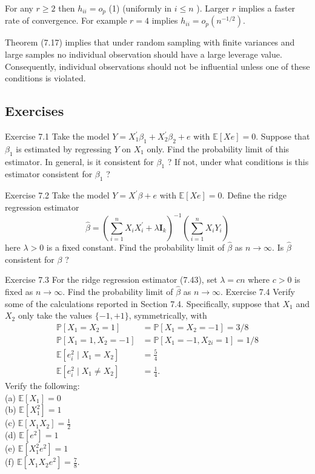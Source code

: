 \documentclass[10pt]{article}
\begin{document}
For any $r \geq 2$ then $h_{i i}=o_{p}$ (1) (uniformly in $i \leq n$ ). Larger $r$ implies a faster rate of convergence. For example $r=4$ implies $h_{i i}=o_{p}\left(n^{-1 / 2}\right)$.

Theorem (7.17) implies that under random sampling with finite variances and large samples no individual observation should have a large leverage value. Consequently, individual observations should not be influential unless one of these conditions is violated.

\subsection{Exercises}
Exercise 7.1 Take the model $Y=X_{1}^{\prime} \beta_{1}+X_{2}^{\prime} \beta_{2}+e$ with $\mathbb{E}[X e]=0$. Suppose that $\beta_{1}$ is estimated by regressing $Y$ on $X_{1}$ only. Find the probability limit of this estimator. In general, is it consistent for $\beta_{1}$ ? If not, under what conditions is this estimator consistent for $\beta_{1}$ ?

Exercise 7.2 Take the model $Y=X^{\prime} \beta+e$ with $\mathbb{E}[X e]=0$. Define the ridge regression estimator
$$
\widehat{\beta}=\left(\sum_{i=1}^{n} X_{i} X_{i}^{\prime}+\lambda \boldsymbol{I}_{k}\right)^{-1}\left(\sum_{i=1}^{n} X_{i} Y_{i}\right)
$$
here $\lambda>0$ is a fixed constant. Find the probability limit of $\widehat{\beta}$ as $n \rightarrow \infty$. Is $\widehat{\beta}$ consistent for $\beta$ ?

Exercise 7.3 For the ridge regression estimator (7.43), set $\lambda=c n$ where $c>0$ is fixed as $n \rightarrow \infty$. Find the probability limit of $\widehat{\beta}$ as $n \rightarrow \infty$. Exercise 7.4 Verify some of the calculations reported in Section 7.4. Specifically, suppose that $X_{1}$ and $X_{2}$ only take the values $\{-1,+1\}$, symmetrically, with
$$
\begin{aligned}
\mathbb{P}\left[X_{1}=X_{2}=1\right] &=\mathbb{P}\left[X_{1}=X_{2}=-1\right]=3 / 8 \\
\mathbb{P}\left[X_{1}=1, X_{2}=-1\right] &=\mathbb{P}\left[X_{1}=-1, X_{2 i}=1\right]=1 / 8 \\
\mathbb{E}\left[e_{i}^{2} \mid X_{1}=X_{2}\right] &=\frac{5}{4} \\
\mathbb{E}\left[e_{i}^{2} \mid X_{1} \neq X_{2}\right] &=\frac{1}{4} .
\end{aligned}
$$
Verify the following:\\
(a) $\mathbb{E}\left[X_{1}\right]=0$\\
(b) $\mathbb{E}\left[X_{1}^{2}\right]=1$\\
(c) $\mathbb{E}\left[X_{1} X_{2}\right]=\frac{1}{2}$\\
(d) $\mathbb{E}\left[e^{2}\right]=1$\\
(e) $\mathbb{E}\left[X_{1}^{2} e^{2}\right]=1$\\
(f) $\mathbb{E}\left[X_{1} X_{2} e^{2}\right]=\frac{7}{8}$.
\end{document}
